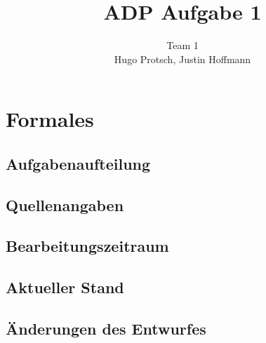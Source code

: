 \documentclass[11pt]{article}
\title{ADP Aufgabe 1}
\author{Team 1\\Hugo Protsch, Justin Hoffmann}
\begin{document}
    \maketitle


    \section{Formales}\label{sec:Formales}

    \subsection{Aufgabenaufteilung}

    \subsection{Quellenangaben}

    \subsection{Bearbeitungszeitraum}

    \subsection{Aktueller Stand}

    \subsection{Änderungen des Entwurfes}
\end{document}
